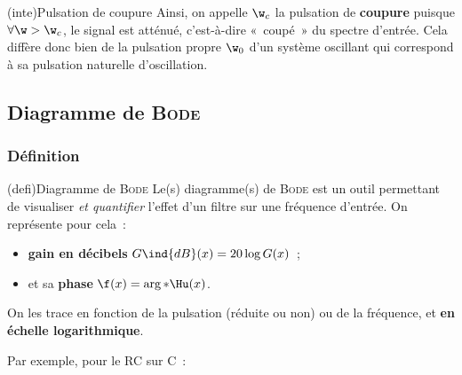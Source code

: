 \documentclass[../../main/main.tex]{subfiles}
\begin{document}
\begin{tcb*}(inte){Pulsation de coupure}
	Ainsi, on appelle $\w_c$ la pulsation de \textbf{coupure} puisque $\forall \w
		> \w_c$, le signal est atténué, c'est-à-dire «~coupé~» du spectre d'entrée.
	Cela diffère donc bien de la pulsation propre $\w_0$ d'un système oscillant
	qui correspond à sa pulsation naturelle d'oscillation.
\end{tcb*}

\subsection{Diagramme de \textsc{Bode}}

\subsubsection{Définition}
\begin{tcb*}(defi){Diagramme de \textsc{Bode}}
	Le(s) diagramme(s) de \textsc{Bode} est un outil permettant de visualiser
	\textit{et quantifier} l'effet d'un filtre sur une fréquence d'entrée. On
	représente pour cela~:
	\begin{itemize}
		\item \textbf{gain en décibels} $G\ind{dB}(x) = 20 \log G(x)$~;
		\item et sa \textbf{phase} $\f(x) = \arg*{{\Hu(x}})$.
	\end{itemize}
	\smallbreak
	On les trace en fonction de la pulsation (réduite ou non) ou de la fréquence,
	et \textbf{en échelle logarithmique}.
\end{tcb*}
Par exemple, pour le RC sur C~:
\end{document}
